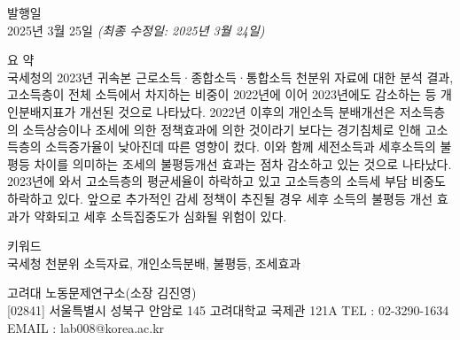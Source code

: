 \documentclass[
  a4paper,
  oneside,
  open=any]{scrbook}
\begin{document}
\begin{frontmatter}
\begin{titlepage}
\begin{minipage}[b][\textheight][s]{\textwidth}
\begin{titlepagebox}
\begin{multicols}{2}
  \end{multicols}

  \vspace{-4mm}


  {\textcolor{anugold}{\MakeUppercase{발행일}}}\\ 2025년 3월 25일
  {\itshape{(최종 수정일: 2025년 3월 24일)}}
  \vspace{3mm}

  \textcolor{anugold}{\MakeUppercase{요 약}}\\
  국세청의 2023년 귀속본 근로소득·종합소득·통합소득 천분위 자료에 대한
  분석 결과, 고소득층이 전체 소득에서 차지하는 비중이 2022년에 이어
  2023년에도 감소하는 등 개인분배지표가 개선된 것으로 나타났다. 2022년
  이후의 개인소득 분배개선은 저소득층의 소득상승이나 조세에 의한
  정책효과에 의한 것이라기 보다는 경기침체로 인해 고소득층의
  소득증가율이 낮아진데 따른 영향이 컸다. 이와 함께 세전소득과
  세후소득의 불평등 차이를 의미하는 조세의 불평등개선 효과는 점차
  감소하고 있는 것으로 나타났다. 2023년에 와서 고소득층의 평균세율이
  하락하고 있고 고소득층의 소득세 부담 비중도 하락하고 있다. 앞으로
  추가적인 감세 정책이 추진될 경우 세후 소득의 불평등 개선 효과가
  약화되고 세후 소득집중도가 심화될 위험이 있다.
  \vspace{3mm}

  {\textcolor{anugold}{키워드}}\\
  국세청 천분위 소득자료, 개인소득분배, 불평등, 조세효과

  \end{titlepagebox}

  \vspace{2\baselineskip}


  \vfill



  고려대 노동문제연구소(소장 김진영)\\{\footnotesize [02841] 서울특별시 성북구 안암로 145 고려대학교 국제관 121A TEL : 02-3290-1634
  EMAIL : lab008@korea.ac.kr}

  \end{minipage}
  \restoregeometry

  \end{titlepage}
  \end{frontmatter}
\end{document}
